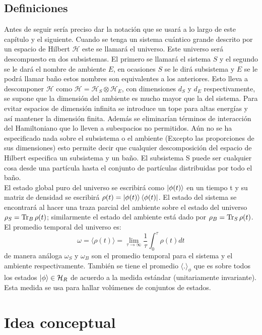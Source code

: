 \subsection{Definiciones}

Antes de seguir sería preciso dar la notación que se usará a lo largo de este capítulo y el siguiente. Cuando se tenga un sistema cuántico grande descrito por un espacio de Hilbert $\mathcal{H}$  este se llamará el universo. Este universo será descompuesto en  dos subsistemas. El primero se llamará el sistema $S$  y el segundo se le dará el nombre de ambiente $E$, en ocasiones $S$ se le dirá subsistema y $E$ se le podrá llamar baño estos nombres son equivalentes a los anteriores. Esto lleva a descomponer $\mathcal{H}$ como $\mathcal{H}=\mathcal{H}_{S} \otimes \mathcal{H}_{E}$, con dimensiones $d_{S}$ y $d_{E}$ respectivamente, se supone que la dimensión del ambiente es mucho mayor que la del sistema. Para evitar espacios de dimensión infinita se introduce un tope para altas energías y así mantener la dimensión finita. Además se eliminarían términos de interacción del Hamiltoniano que lo lleven a subespacios no permitidos. Aún no se ha especificado nada sobre el subsistema o el ambiente (Excepto las proporciones de sus dimensiones)  esto permite decir que cualquier descomposición del espacio de Hilbert especifica un subsistema y un baño. El subsistema S puede ser cualquier cosa desde una partícula hasta el conjunto de partículas distribuidas por todo el baño.
\\
El estado global puro del universo se escribirá como $\ket{\phi(t)}$ en un tiempo t y su matriz de densidad se escribirá $\rho(t)=\ket{\phi(t)}\bra{\phi(t)}$. El estado del sistema se encontrará al hacer una traza parcial del ambiente sobre el estado del universo $\rho_{S}= \Tr _{B} \rho(t)$; similarmente el estado del ambiente está dado por $\rho_{B}=\Tr _{S} \rho(t)$. El promedio temporal del universo es:
\begin{equation}
\omega= \langle \rho(t) \rangle= \lim_{\tau \to \infty} \frac{1}{\tau} \int_{0}^{\tau} \rho (t)dt
\end{equation}
de manera análoga $\omega_{S}$ y $\omega_{B}$ son el promedio temporal para el sistema y el ambiente respectivamente. También se tiene el promedio $\langle . \rangle_{\phi}$ que es sobre todos los estados $\ket{\phi} \in \mathcal{H}_{R}$ de acuerdo a la medida estándar (unitariamente invariante). Esta medida se usa para hallar volúmenes de conjuntos de estados.

\section{Idea conceptual}

